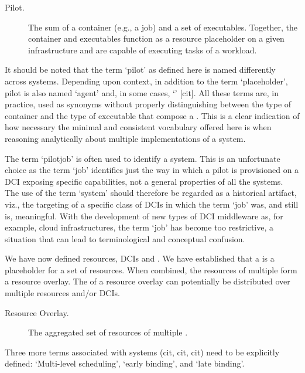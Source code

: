 \documentclass{sig-alternate}
\begin{document}
\begin{description}

\item[Pilot.] The sum of a container (e.g., a job) and a set of executables.
Together, the container and executables function as a resource placeholder on a
given infrastructure and are capable of executing tasks of a workload.

\end{description}

It should be noted that the term `pilot' as defined here is named differently
across \pilot systems. Depending upon context, in addition to the term
`placeholder', pilot is also named `agent' and, in some cases, `\pilotjob'
[cit]. All these terms are, in practice, used as synonyms without properly
distinguishing between the type of container and the type of executable that
compose a \pilot. This is a clear indication of how necessary the minimal and
consistent vocabulary offered here is when reasoning analytically about
multiple implementations of a \pilotjob system.

The term `pilotjob' is often used to identify a \pilot system. This is an
unfortunate choice as the term `job' identifies just the way in which a pilot
is provisioned on a DCI exposing specific capabilities, not a general
properties of all the \pilot systems. The use of the term `\pilotjob system'
should therefore be regarded as a historical artifact, viz., the targeting of a
specific class of DCIs in which the term `job' was, and still is, meaningful.
With the development of new types of DCI middleware as, for example, cloud
infrastructures, the term `job' has become too restrictive, a situation that
can lead to terminological and conceptual confusion.

We have now defined resources, DCIs and \pilots. We have established that a
\pilot is a placeholder for a set of resources. When combined, the resources of
multiple \pilots form a resource overlay. The \pilots of a resource overlay can
potentially be distributed over multiple resources and/or DCIs.


\begin{description}
\item[Resource Overlay.] The aggregated set of resources of multiple \pilots.
\end{description}

Three more terms associated with \pilot systems (cit, cit, cit) need to be
explicitly defined: `Multi-level scheduling', `early binding', and `late
binding'.
\end{document}
